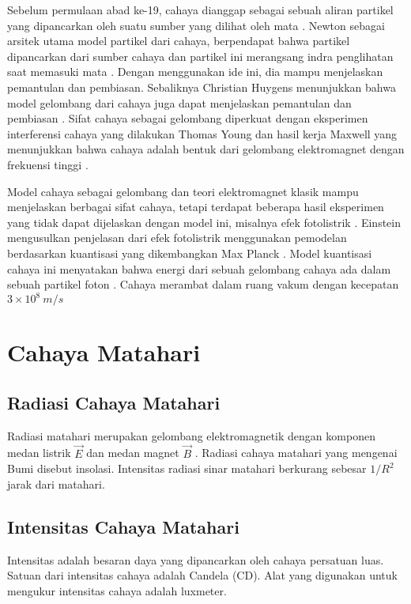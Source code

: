 Sebelum permulaan abad ke-19, cahaya dianggap sebagai sebuah aliran partikel yang dipancarkan oleh suatu sumber yang dilihat oleh mata \cite{Serway2018-if}. Newton sebagai arsitek utama model partikel dari cahaya, berpendapat bahwa partikel dipancarkan dari sumber cahaya dan partikel ini merangsang indra penglihatan saat memasuki mata \cite{Serway2018-if}. Dengan menggunakan ide ini, dia mampu menjelaskan pemantulan dan pembiasan. Sebaliknya Christian Huygens menunjukkan bahwa model gelombang dari cahaya juga dapat menjelaskan pemantulan dan pembiasan \cite{Pedrotti2006-ek}. Sifat cahaya sebagai gelombang diperkuat dengan eksperimen interferensi cahaya yang dilakukan Thomas Young dan hasil kerja Maxwell yang menunjukkan bahwa cahaya adalah bentuk dari gelombang elektromagnet dengan frekuensi tinggi \cite{Hecht2015-by}.

Model cahaya sebagai gelombang dan teori elektromagnet klasik mampu menjelaskan berbagai sifat cahaya, tetapi terdapat beberapa hasil eksperimen yang tidak dapat dijelaskan dengan model ini, misalnya efek fotolistrik \cite{Hecht2015-by}. Einstein mengusulkan penjelasan dari efek fotolistrik menggunakan pemodelan berdasarkan kuantisasi yang dikembangkan Max Planck \cite{Krane2012-fm}. Model kuantisasi cahaya ini menyatakan bahwa energi dari sebuah gelombang cahaya ada dalam sebuah partikel foton \cite{Krane2012-fm}. Cahaya merambat dalam ruang vakum dengan kecepatan $3\times 10^8\ \si{m/s}$

\section{Cahaya Matahari}
\subsection{Radiasi Cahaya Matahari}
Radiasi matahari merupakan gelombang elektromagnetik dengan komponen medan listrik $\vec{E}$ dan medan magnet $\vec{B}$ \cite{Hecht2015-by}. Radiasi cahaya matahari yang mengenai Bumi disebut insolasi. Intensitas radiasi sinar matahari berkurang sebesar $1/R^2$ jarak dari matahari.
\subsection{Intensitas Cahaya Matahari}
Intensitas adalah besaran daya yang dipancarkan oleh cahaya persatuan luas. Satuan dari intensitas cahaya adalah Candela (CD). Alat yang digunakan untuk mengukur intensitas cahaya adalah luxmeter. 

